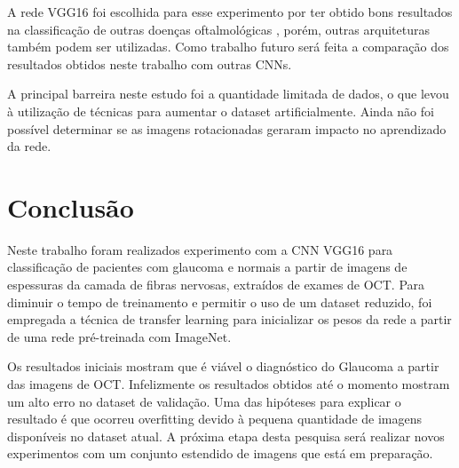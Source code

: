 \documentclass[conference]{IEEEtran}
\begin{document}

A rede VGG16 foi escolhida para esse experimento por ter obtido bons resultados na classificação de outras doenças oftalmológicas \cite{li2017, lee2017}, porém, outras arquiteturas também podem ser utilizadas. Como trabalho futuro será feita a comparação dos resultados obtidos neste trabalho com outras CNNs.

A principal barreira neste estudo foi a quantidade limitada de dados, o que levou à utilização de técnicas para aumentar o dataset artificialmente. Ainda não foi possível determinar se as imagens rotacionadas geraram impacto no aprendizado da rede. 


\section{Conclusão}

Neste trabalho foram realizados experimento com a CNN VGG16 para classificação de pacientes com glaucoma e normais a partir de imagens de espessuras da camada de fibras nervosas, extraídos de exames de OCT. Para diminuir o tempo de treinamento e permitir o uso de um dataset reduzido, foi empregada a técnica de transfer learning para inicializar os pesos da rede a partir de uma rede pré-treinada com ImageNet.

Os resultados iniciais mostram que é viável o diagnóstico do Glaucoma a partir das imagens de OCT. Infelizmente os resultados obtidos até o momento mostram um alto erro no dataset de validação. Uma das hipóteses para explicar o resultado é que ocorreu overfitting devido à pequena quantidade de imagens disponíveis no dataset atual. A próxima etapa desta pesquisa será realizar novos experimentos com um conjunto estendido de imagens que está em preparação.




\end{document}
